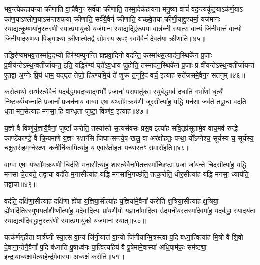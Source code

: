 भव॒न्त्येक॑हायन्या क्रीणाति वा॒चैवैन॒ꣳ॒ सर्व॑या क्रीणाति॒ तस्मा॒देक॑हायना मनु॒ष्या॑ वाचं॑ वद॒न्त्यकू॑ट॒या\-ऽक॑र्ण॒या\-ऽ का॑ण॒या\-ऽश्लो॑ण॒या\-ऽस॑प्तशफया क्रीणाति॒ सर्व॑यै॒वैनं॑ क्रीणाति॒ यच्छ्वे॒तया᳚ क्रीणी॒याद्दु॒श्चर्मा॒ यज॑मानः स्या॒द्यत्कृ॒ष्णया॑नु॒स्तर॑णी स्यात्प्र॒मायु॑को॒ यज॑मानः स्या॒द्यद्द्वि॑रू॒पया॒ वात्र॑घ्नी स्या॒त्स वा॒न्यं जि॑नी॒यात्तं वा॒न्यो जि॑नीयादरु॒णया॑ पिङ्गा॒क्ष्या क्री॑णात्ये॒तद्वै सोम॑स्य रू॒पꣴ स्वयै॒वैनं॑ दे॒वत॑या क्रीणाति॥४५॥

{\anuvakamend[{निष्क्री॑णीष्व॒ दक्षि॑णाभिश्च वदन्ति॒ मन्य॑न्ते गन्ध॒र्वेभ्यो॑ ब॒हुत॑याः पिङ्गा॒क्ष्या दश॑ च॥६॥}]}

तद्धिर॑ण्यमभव॒त्तस्मा॑द॒द्भ्यो हिर॑ण्यम्पुनन्ति ब्रह्मवा॒दिनो॑ वदन्ति॒ कस्मा᳚थ्स॒त्याद॑न॒स्थिके॑न प्र॒जाः प्र॒वीय॑न्ते\-ऽ\-स्थ॒न्वती᳚र्जायन्त॒ इति॒ यद्धिर॑ण्यं घृ॒ते॑\-ऽव॒धाय॑ जु॒होति॒ तस्मा॑दन॒स्थिके॑न प्र॒जाः प्र वी॑यन्ते\-ऽस्थ॒न्वती᳚र्जायन्त ए॒तद्वा अ॒ग्नेः प्रि॒यं धाम॒ यद्घृ॒तं तेजो॒ हिर॑ण्यमि॒यं ते॑ शुक्र त॒नूरि॒दं वर्च॒ इत्या॑ह॒ सते॑जसमे॒वैन॒ꣳ॒ सत॑नुम्॥४६॥

क॒रो॒त्यथो॒ सम्भ॑रत्ये॒वैनं॒ यदब॑द्धमवद॒ध्याद्गर्भाः᳚ प्र॒जानां᳚ परा॒पातु॑काः स्युर्ब॒द्धमव॑ दधाति॒ गर्भा॑णां॒ धृत्यै॑ निष्ट॒र्क्य॑म्बध्नाति प्र॒जानां᳚ प्र॒जन॑नाय॒ वाग्वा ए॒षा यथ्सो॑म॒क्रय॑णी॒ जूर॒सीत्या॑ह॒ यद्धि मन॑सा॒ जव॑ते॒ तद्वा॒चा वद॑ति धृ॒ता मन॒सेत्या॑ह॒ मन॑सा॒ हि वाग्धृ॒ता जुष्टा॒ विष्ण॑व॒ इत्या॑ह॥४७॥

य॒ज्ञो वै विष्णु॑र्य॒ज्ञायै॒वैनां॒ जुष्टां᳚ करोति॒ तस्या᳚स्ते स॒त्यस॑वसः प्रस॒व इत्या॑ह सवि॒तृप्र॑सूतामे॒व वाच॒मव॑ रुन्द्धे॒ काण्डे॑काण्डे॒ वै क्रि॒यमा॑णे य॒ज्ञꣳ रक्षाꣳ॑सि जिघाꣳसन्त्ये॒ष खलु॒ वा अर॑क्षोहतः॒ पन्था॒ यो᳚\-ऽग्नेश्च॒ सूर्य॑स्य च॒ सूर्य॑स्य॒ चक्षु॒रारु॑हम॒ग्नेर॒क्ष्णः क॒नीनि॑का॒मित्या॑ह॒ य ए॒वार॑क्षोहतः॒ पन्था॒स्तꣳ स॒मारो॑हति॥४८॥

वाग्वा ए॒षा यथ्सो॑म॒क्रय॑णी॒ चिद॑सि म॒नासीत्या॑ह॒ शास्त्ये॒वैना॑मे॒तत्तस्मा᳚च्छि॒ष्टाः प्र॒जा जा॑यन्ते॒ चिद॒सीत्या॑ह॒ यद्धि मन॑सा चे॒तय॑ते॒ तद्वा॒चा वद॑ति म॒नासीत्या॑ह॒ यद्धि मन॑साभि॒गच्छ॑ति॒ तत्क॒रोति॒ धीर॒सीत्या॑ह॒ यद्धि मन॑सा॒ ध्याय॑ति॒ तद्वा॒चा॥४९॥

वद॑ति॒ दक्षि॑णा॒सीत्या॑ह॒ दक्षि॑णा ह्ये॑षा य॒ज्ञिया॒सीत्या॑ह य॒ज्ञिया॑मे॒वैनां᳚ करोति क्ष॒त्रिया॒सीत्या॑ह क्ष॒त्रिया॒ ह्ये॑षादि॑तिरस्युभ॒यतः॑शी॒र्\mbox{}ष्णीत्या॑ह॒ यदे॒वादि॒त्यः प्रा॑य॒णीयो॑ य॒ज्ञाना॑मादि॒त्य उ॑दय॒नीय॒स्तस्मा॑दे॒वमा॑ह॒ यदब॑द्धा॒ स्यादय॑ता स्या॒द्यत्प॑दिब॒द्धानु॒स्तर॑णी स्यात्प्र॒मायु॑को॒ यज॑मानः स्यात्॥५०॥

यत्क॑र्णगृही॒ता वार्त्र॑घ्नी स्या॒त्स वा॒न्यं जि॑नी॒यात्तं वा॒न्यो जि॑नीयान्मि॒त्रस्त्वा॑ प॒दि ब॑ध्ना॒त्वित्या॑ह मि॒त्रो वै शि॒वो दे॒वाना॒न्तेनै॒वैनां᳚ प॒दि ब॑ध्नाति पू॒षाध्व॑नः पा॒त्वित्या॑हे॒यं वै पू॒षेमामे॒वास्या॑ अधि॒पाम॑कः॒ सम॑ष्ट्या॒ इन्द्रा॒याध्य॑क्षा॒येत्या॒हेन्द्र॑मे॒वास्या॒ अध्य॑क्षं करोति॥५१॥


